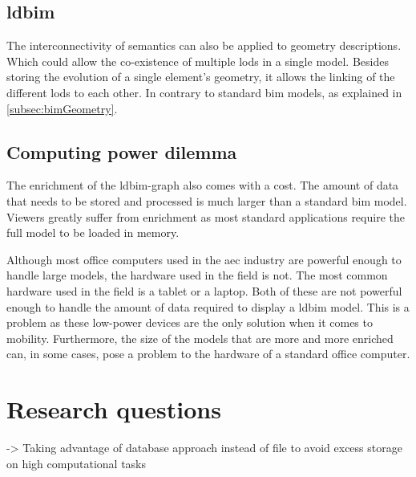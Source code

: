 \subsection{\acs{ldbim}}





The interconnectivity of semantics can also be applied to geometry descriptions. Which could allow the co-existence of multiple \ac{lod}s in a single model. Besides storing the evolution of a single element's geometry, it allows the linking of the different \ac{lod}s to each other. In contrary to standard \ac{bim} models, as explained in \ref{subsec:bimGeometry}.

\subsection{Computing power dilemma} \label{subsec:computingPower}
The enrichment of the \ac{ldbim}-graph also comes with a cost. The amount of data that needs to be stored and processed is much larger than a standard \ac{bim} model. Viewers greatly suffer from enrichment as most standard applications require the full model to be loaded in memory.

Although most office computers used in the \ac{aec} industry are powerful enough to handle large models, the hardware used in the field is not. The most common hardware used in the field is a tablet or a laptop. Both of these are not powerful enough to handle the amount of data required to display a \ac{ldbim} model. This is a problem as these low-power devices are the only solution when it comes to mobility. Furthermore, the size of the models that are more and more enriched can, in some cases, pose a problem to the hardware of a standard office computer.


\section{Research questions}
-> Taking advantage of database approach instead of file to avoid excess storage on high computational tasks


